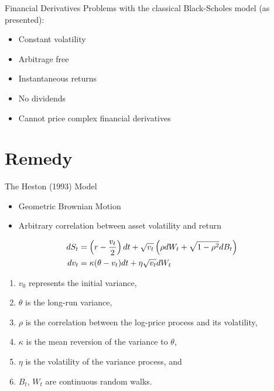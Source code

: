 \documentclass[aspectratio=169,xcolor=dvipsnames]{beamer}
\begin{document}
	\begin{frame}{Financial Derivatives}
		Problems with the classical Black-Scholes model (as presented):
		\begin{itemize}
			\item{Constant volatility}
			\item{Arbitrage free}
			\item{Instantaneous returns}
			\item{No dividends}
			\item{Cannot price complex financial derivatives}
		\end{itemize}
	\end{frame}
	
	\section{Remedy}
	
	\begin{frame}{The Heston (1993) Model}
		\begin{itemize}
			\item Geometric Brownian Motion
			\item Arbitrary correlation between asset volatility and return
		\end{itemize}
		\begin{align}
			dS_t &= \left( r - \frac{v_t}{2} \right) dt + \sqrt{v_t} \left( \rho dW_t + \sqrt{1 - \rho^2} dB_t \right) \label{eq:hdXt} \\
			dv_t &= \kappa (\theta - v_t) dt + \eta \sqrt{v_t} dW_t \hspace{1.8cm} \label{eq:hdvt}
		\end{align}
		\begin{enumerate}
			\item $v_0$ represents the initial variance,
			\item $\theta$ is the long-run variance,
			\item $\rho$ is the correlation between the log-price process and its volatility,
			\item $\kappa$ is the mean reversion of the variance to $\theta$,
			\item $\eta$ is the volatility of the variance process, and 
			\item $B_{t}$, $W_{t}$ are continuous random walks.
		\end{enumerate}
	\end{frame}
	
\end{document}
